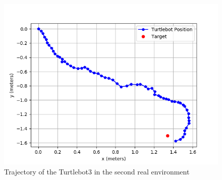 \begin{figure}[htbp]
\centerline{\includegraphics[width=\columnwidth]{images/test_env2.png}}
\caption{Trajectory of the Turtlebot3 in the second real environment}
\label{fig:env2_graph}
\end{figure}

